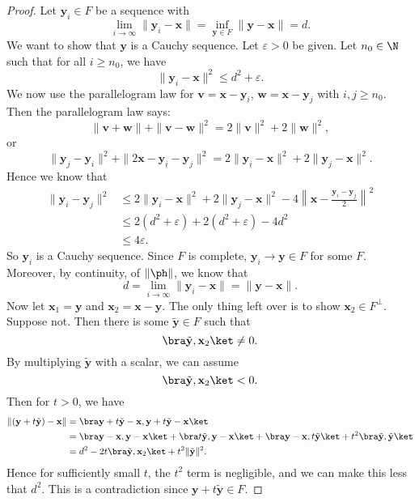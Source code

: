 \documentclass[a4paper]{article}
\begin{document}
\begin{proof}
  Let $\mathbf{y}_i \in F$ be a sequence with
  \[
    \lim_{i \to \infty} \|\mathbf{y}_i - \mathbf{x}\| = \inf_{\mathbf{y} \in F} \|\mathbf{y} - \mathbf{x}\| = d.
  \]
  We want to show that $\mathbf{y}$ is a Cauchy sequence. Let $\varepsilon > 0$ be given. Let $n_0 \in \N$ such that for all $i \geq n_0$, we have
  \[
    \|\mathbf{y}_i - \mathbf{x}\|^2 \leq d^2 + \varepsilon.
  \]
  We now use the parallelogram law for $\mathbf{v} = \mathbf{x} - \mathbf{y}_i$, $\mathbf{w} = \mathbf{x} - \mathbf{y}_j$ with $i, j \geq n_0$. Then the parallelogram law says:
  \[
    \|\mathbf{v} + \mathbf{w}\| + \|\mathbf{v} - \mathbf{w}\|^2 = 2\|\mathbf{v}\|^2 + 2\|\mathbf{w}\|^2,
  \]
  or
  \[
    \|\mathbf{y}_j - \mathbf{y}_i\|^2 + \|2\mathbf{x} - \mathbf{y}_i - \mathbf{y}_j\|^2 = 2\|\mathbf{y}_i - \mathbf{x}\|^2 + 2\|\mathbf{y}_j - \mathbf{x}\|^2.
  \]
  Hence we know that
  \begin{align*}
    \|\mathbf{y}_i - \mathbf{y}_j\|^2 &\leq 2\|\mathbf{y}_i - \mathbf{x}\|^2 + 2\|\mathbf{y}_j - \mathbf{x}\|^2 - 4\left\|\mathbf{x} - \frac{\mathbf{y}_i - \mathbf{y}_j}{2}\right\|^2\\
    &\leq 2(d^2 + \varepsilon) + 2(d^2 + \varepsilon) - 4d^2\\
    &\leq 4\varepsilon.
  \end{align*}
  So $\mathbf{y}_i$ is a Cauchy sequence. Since $F$ is complete, $\mathbf{y}_i \to \mathbf{y} \in F$ for some $F$. Moreover, by continuity, of $\|\ph\|$, we know that
  \[
    d = \lim_{i \to \infty}\|\mathbf{y}_i - \mathbf{x}\| = \|\mathbf{y} - \mathbf{x}\|.
  \]
  Now let $\mathbf{x}_1 = \mathbf{y}$ and $\mathbf{x}_2 = \mathbf{x} - \mathbf{y}$. The only thing left over is to show $\mathbf{x}_2 \in F^\perp$. Suppose not. Then there is some $\tilde{\mathbf{y}} \in F$ such that
  \[
    \bra \tilde{\mathbf{y}}, \mathbf{x}_2 \ket \not= 0.
  \]
  By multiplying $\tilde{\mathbf{y}}$ with a scalar, we can assume
  \[
    \bra \tilde{\mathbf{y}}, \mathbf{x}_2\ket < 0.
  \]
  Then for $t > 0$, we have
  \begin{align*}
    \|(\mathbf{y} + t\tilde{\mathbf{y}}) - \mathbf{x}\| &= \bra \mathbf{y} + t\tilde{\mathbf{y}} - \mathbf{x}, \mathbf{y} + t\tilde{\mathbf{y}} - \mathbf{x}\ket \\
    &= \bra \mathbf{y} - \mathbf{x}, \mathbf{y} - \mathbf{x}\ket + \bra t\tilde{\mathbf{y}}, \mathbf{y} - \mathbf{x}\ket + \bra \mathbf{y} - \mathbf{x}, t\tilde{\mathbf{y}}\ket + t^2 \bra \tilde{\mathbf{y}}, \tilde{\mathbf{y}}\ket\\
    &= d^2 - 2t \bra \tilde{\mathbf{y}}, \mathbf{x}_2\ket + t^2 \|\tilde{\mathbf{y}}\|^2.
  \end{align*}
  Hence for sufficiently small $t$, the $t^2$ term is negligible, and we can make this less that $d^2$. This is a contradiction since $\mathbf{y} + t\tilde{\mathbf{y}} \in F$.
\end{proof}
\end{document}
